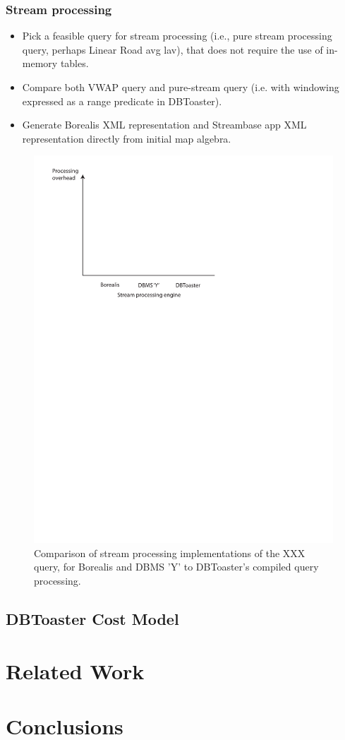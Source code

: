 \documentclass{sig-alternate}
\begin{document}
\subsubsection{Stream processing}
\begin{itemize}
\item Pick a feasible query for stream processing (i.e., pure stream processing
  query, perhaps Linear Road avg lav), that does not require the use of
  in-memory tables.
\item Compare both VWAP query and pure-stream query (i.e. with windowing
  expressed as a range predicate in DBToaster).
\item Generate Borealis XML representation and Streambase app XML representation
  directly from initial map algebra.
\end{itemize}

\begin{figure}
\includegraphics[scale=0.6]{figures/axes-streams.pdf}
\caption{Comparison of stream processing implementations of the XXX query, for
  Borealis and DBMS 'Y' to DBToaster's compiled query processing.}
\label{fig:overhead-stream}
\end{figure}

\subsection{DBToaster Cost Model}

\section{Related Work}

\section{Conclusions}
\end{document}
